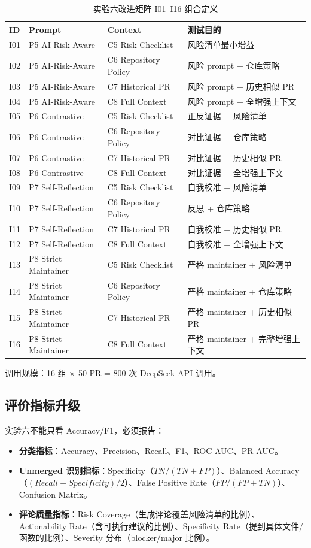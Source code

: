 \documentclass{experimentreport}
\begin{document}
\begin{table}[htbp]
\centering
\caption{实验六改进矩阵 I01--I16 组合定义}
\begin{tabular}{llll}
\toprule
ID & Prompt & Context & 测试目的 \\
\midrule
I01 & P5 AI-Risk-Aware & C5 Risk Checklist & 风险清单最小增益 \\
I02 & P5 AI-Risk-Aware & C6 Repository Policy & 风险 prompt + 仓库策略 \\
I03 & P5 AI-Risk-Aware & C7 Historical PR & 风险 prompt + 历史相似 PR \\
I04 & P5 AI-Risk-Aware & C8 Full Context & 风险 prompt + 全增强上下文 \\
I05 & P6 Contrastive & C5 Risk Checklist & 正反证据 + 风险清单 \\
I06 & P6 Contrastive & C6 Repository Policy & 对比证据 + 仓库策略 \\
I07 & P6 Contrastive & C7 Historical PR & 对比证据 + 历史相似 PR \\
I08 & P6 Contrastive & C8 Full Context & 对比证据 + 全增强上下文 \\
I09 & P7 Self-Reflection & C5 Risk Checklist & 自我校准 + 风险清单 \\
I10 & P7 Self-Reflection & C6 Repository Policy & 反思 + 仓库策略 \\
I11 & P7 Self-Reflection & C7 Historical PR & 自我校准 + 历史相似 PR \\
I12 & P7 Self-Reflection & C8 Full Context & 自我校准 + 全增强上下文 \\
I13 & P8 Strict Maintainer & C5 Risk Checklist & 严格 maintainer + 风险清单 \\
I14 & P8 Strict Maintainer & C6 Repository Policy & 严格 maintainer + 仓库策略 \\
I15 & P8 Strict Maintainer & C7 Historical PR & 严格 maintainer + 历史相似 PR \\
I16 & P8 Strict Maintainer & C8 Full Context & 严格 maintainer + 完整增强上下文 \\
\bottomrule
\end{tabular}
\end{table}

调用规模：16 组 $\times$ 50 PR = 800 次 DeepSeek API 调用。

\subsection{评价指标升级}

实验六不能只看 Accuracy/F1，必须报告：
\begin{itemize}
    \item \textbf{分类指标}：Accuracy、Precision、Recall、F1、ROC-AUC、PR-AUC。
    \item \textbf{Unmerged 识别指标}：Specificity（$TN/(TN+FP)$）、Balanced Accuracy（$(Recall+Specificity)/2$）、False Positive Rate（$FP/(FP+TN)$）、Confusion Matrix。
    \item \textbf{评论质量指标}：Risk Coverage（生成评论覆盖风险清单的比例）、Actionability Rate（含可执行建议的比例）、Specificity Rate（提到具体文件/函数的比例）、Severity 分布（blocker/major 比例）。
\end{itemize}
\end{document}
